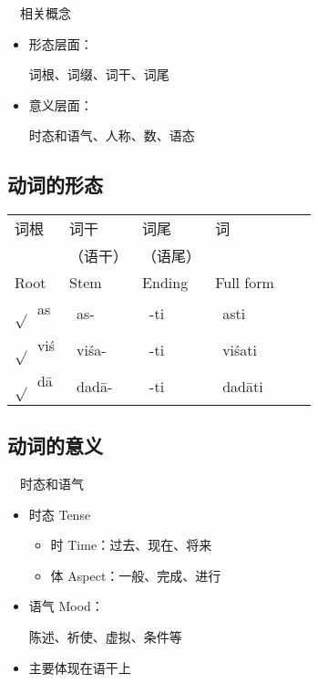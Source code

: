\documentclass[17pt]{beamer}
\newcommand{\skt}[1]{{\sanskritfont{#1}}} %
\newcommand{\skttrans}[1]{{\skt{#1}~#1}}  %
\newcommand{\verbroot}[1]{{$\sqrt{#1}$}}
\newcommand{\sktroot}[1]{{\verbroot{}\skt{#1}}}
\newcommand{\skttransroot}[1]{{\sktroot{#1}~#1}}
\begin{document}
\begin{frame}{\insertsection ~~相关概念}
  \begin{itemize}
    \item
      形态层面：
      
      词根、词缀、词干、词尾
    \item
      意义层面：
      
      时态和语气、人称、数、语态
  \end{itemize}
  
\end{frame}

\subsection{动词的形态}

\begin{frame}{\insertsubsection }
  \small
  \centering
  \begin{tabular}{@{}llllll@{}} %
    词根 & 词干 & 词尾 & 词  \\
    & （语干） & （语尾） &   \\
    Root & Stem & Ending & Full form   \\    
    \skttransroot{as} & \skttrans{as-} & \skttrans{-ti} & \skttrans{asti}  \\
    \skttransroot{viś}& \skttrans{viśa-} & \skttrans{-ti} & \skttrans{viśati}  \\
    \skttransroot{dā} & \skttrans{dadā-} & \skttrans{-ti} & \skttrans{dadāti} \\
  \end{tabular}
\end{frame}

\subsection{动词的意义}

\begin{frame}{\insertsubsection ~~时态和语气}
  \begin{itemize}
    \item
      时态 Tense
      \begin{itemize}
        \item 时 Time：过去、现在、将来
        \item 体 Aspect：一般、完成、进行
      \end{itemize}
    \item
      语气 Mood：
      
    陈述、祈使、虚拟、条件等
    \item
      主要体现在语干上
  \end{itemize}
\end{frame}
\end{document}
